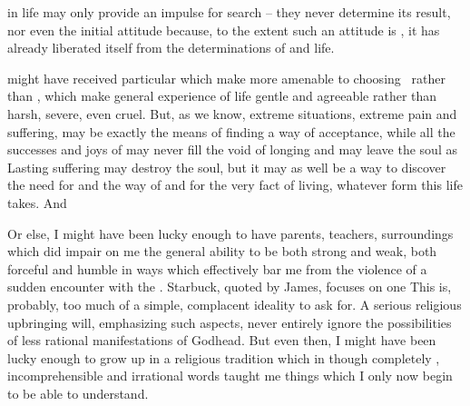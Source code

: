 {\pa
{} in life may only provide an impulse for
 search -- they never determine its result, nor even the
initial attitude because, to the extent such an attitude is
, it has already liberated itself from the
determinations of  and life.

 might have
received particular  which make  more
amenable to choosing \yes\ rather than \No, which make  general
experience of life gentle and agreeable rather than harsh, severe,
even cruel. 
But, as we know, extreme situations,
extreme pain and suffering, may be exactly the means of finding a way
of  acceptance, while all the successes and joys of
 may never fill the void of longing and may leave the
soul  as 
 Lasting suffering may destroy the 
soul, but it may as well be a way to discover the need for and the way 
of  and  for the very fact of 
living, whatever form this life takes. And 

Or else, I might have been lucky enough to have parents, teachers,
surroundings which did impair on me the general ability to be both
strong and weak, both forceful and humble in ways which effectively
bar me from the violence of a sudden encounter with the
.  Starbuck, quoted by James, focuses on one  This is, probably, too much of a simple, complacent ideality to
ask for. A serious religious upbringing will, emphasizing such
aspects, never entirely ignore the possibilities of less rational
manifestations of Godhead.  But even then, I might have been lucky
enough to grow up in a religious tradition which in  though
completely , incomprehensible and irrational words taught me
things which I only now begin to be able to understand.  

}
